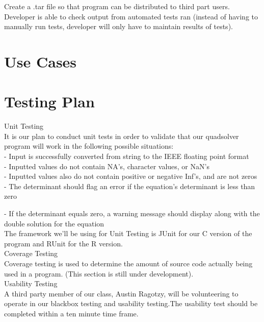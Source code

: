 \documentclass[notitlepage,a4paper,12pt]{article}
\begin{document}
Create a .tar file so that program can be distributed to third part users. \\

Developer is able to check output from automated tests ran (instead of having to manually run tests, developer will only have to maintain results of tests). \\

\section*{Use Cases}

\section*{Testing Plan}
Unit Testing \\

It is our plan to conduct unit tests in order to validate that our quadsolver program will work in the following possible situations: \\

 - Input is successfully converted from string to the IEEE floating point format \\
 
 - Inputted values do not contain NA's, character values, or NaN's \\
 
 - Inputted values also do not contain positive or negative Inf's, and are not zeros \\
 
 - The determinant should flag an error if the equation's determinant is less than zero
 
 - If the determinant equals zero, a warning message should display along with the double solution for the equation\\
 
The framework we'll be using for Unit Testing is JUnit for our C version of the program and RUnit for the R version. \\
 
Coverage Testing \\

Coverage testing is used to determine the amount of source code actually being used in a program. (This section is still under development). \\

Usability Testing \\

A third party member of our class, Austin Ragotzy, will be volunteering to operate in our blackbox testing and usability testing.The usability test should be completed within a ten minute time frame. 
\end{document}
